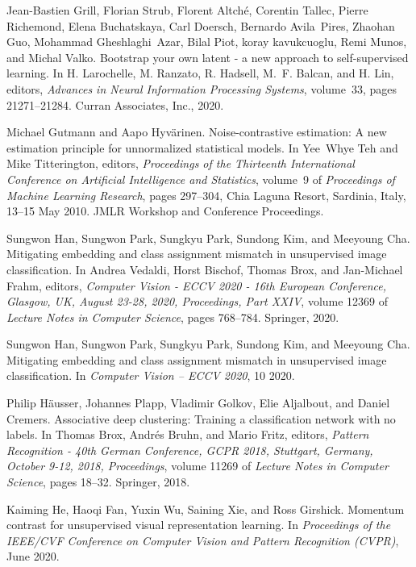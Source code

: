 \documentclass[journal]{IEEEtran}
\begin{document}
{\begin{thebibliography}{10}
Jean-Bastien Grill, Florian Strub, Florent Altch\'{e}, Corentin Tallec, Pierre
  Richemond, Elena Buchatskaya, Carl Doersch, Bernardo Avila~Pires, Zhaohan
  Guo, Mohammad Gheshlaghi~Azar, Bilal Piot, koray kavukcuoglu, Remi Munos, and
  Michal Valko.
\newblock Bootstrap your own latent - a new approach to self-supervised
  learning.
\newblock In H. Larochelle, M. Ranzato, R. Hadsell, M.~F. Balcan, and H. Lin,
  editors, {\em Advances in Neural Information Processing Systems}, volume~33,
  pages 21271--21284. Curran Associates, Inc., 2020.

Michael Gutmann and Aapo Hyvärinen.
\newblock Noise-contrastive estimation: A new estimation principle for
  unnormalized statistical models.
\newblock In Yee~Whye Teh and Mike Titterington, editors, {\em Proceedings of
  the Thirteenth International Conference on Artificial Intelligence and
  Statistics}, volume~9 of {\em Proceedings of Machine Learning Research},
  pages 297--304, Chia Laguna Resort, Sardinia, Italy, 13--15 May 2010. JMLR
  Workshop and Conference Proceedings.

Sungwon Han, Sungwon Park, Sungkyu Park, Sundong Kim, and Meeyoung Cha.
\newblock Mitigating embedding and class assignment mismatch in unsupervised
  image classification.
\newblock In Andrea Vedaldi, Horst Bischof, Thomas Brox, and Jan{-}Michael
  Frahm, editors, {\em Computer Vision - {ECCV} 2020 - 16th European
  Conference, Glasgow, UK, August 23-28, 2020, Proceedings, Part {XXIV}},
  volume 12369 of {\em Lecture Notes in Computer Science}, pages 768--784.
  Springer, 2020.

Sungwon Han, Sungwon Park, Sungkyu Park, Sundong Kim, and Meeyoung Cha.
\newblock Mitigating embedding and class assignment mismatch in unsupervised
  image classification.
\newblock In {\em Computer Vision -- ECCV 2020}, 10 2020.

Philip H{\"{a}}usser, Johannes Plapp, Vladimir Golkov, Elie Aljalbout, and
  Daniel Cremers.
\newblock Associative deep clustering: Training a classification network with
  no labels.
\newblock In Thomas Brox, Andr{\'{e}}s Bruhn, and Mario Fritz, editors, {\em
  Pattern Recognition - 40th German Conference, {GCPR} 2018, Stuttgart,
  Germany, October 9-12, 2018, Proceedings}, volume 11269 of {\em Lecture Notes
  in Computer Science}, pages 18--32. Springer, 2018.

Kaiming He, Haoqi Fan, Yuxin Wu, Saining Xie, and Ross Girshick.
\newblock Momentum contrast for unsupervised visual representation learning.
\newblock In {\em Proceedings of the IEEE/CVF Conference on Computer Vision and
  Pattern Recognition (CVPR)}, June 2020.


\end{thebibliography}}
\end{document}
